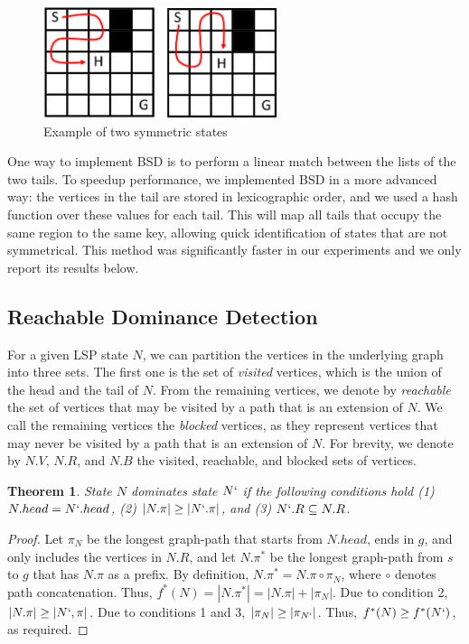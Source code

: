 \documentclass[letterpaper]{article} %
\newcommand\Yossi[1]{\nb{\textbf{Yossi:}}{green}{#1}}
\newcommand\Roni[1]{\nb{\textbf{Roni:}}{blue}{#1}}
\newtheorem{theorem}{Theorem}
\begin{document}
\begin{figure}[ht!]
  \centering
  \includegraphics[width=2.7in]{fig/bsd-example.png}
  \caption{Example of two symmetric states}\label{bsd-example}
\end{figure}

One way to implement BSD is to perform a linear match between the lists of the two tails. To speedup performance, we implemented BSD in a more advanced way: the vertices in the tail are stored in lexicographic order, and we used a hash function over these values for each tail. This will map all tails that occupy the same region to the same key, allowing quick identification of states that are not symmetrical. This method was significantly faster in our experiments and we only report its results below.

\subsection{Reachable Dominance Detection}
For a given LSP state $N$, we can partition the vertices in the underlying graph into three sets. The first one is the set of {\em visited} vertices, which is the union of the head and the tail of $N$. 
From the remaining vertices, we denote by \emph{reachable} the set of vertices that may be visited by a path that is an extension of $N$. 
We call the remaining vertices the \emph{blocked} vertices, as they represent vertices that may never be visited by a path that is an extension of $N$. 
For brevity, we denote by $N.V$, $N.R$, and $N.B$ the visited, reachable, and blocked sets of vertices. 

\begin{theorem}
State $N$ dominates state $N`$ if the following conditions hold (1)$N.head=N`.head$, 
(2) $|N.\pi| \geq |N`.\pi|$, and (3) $N`.R \subseteq N.R$.
 \label{the:rsd}
\end{theorem}
\begin{proof}

Let $\pi_N$ be the longest graph-path that starts from $N.head$, 
ends in $g$, and only includes the vertices in $N.R$, 
and let $N.\pi^*$ be the longest graph-path from $s$ to $g$ that has $N.\pi$ as a prefix. 
By definition, $N.\pi^*=N.\pi \circ \pi_N$, where $\circ$ denotes path concatenation. 
Thus, $f^*(N)=|N.\pi^*|=|N.\pi|+|\pi_N|$. 
Due to condition 2, $|N.\pi|\geq |N`,\pi|$. 
Due to conditions 1 and 3, $|\pi_N|\geq |\pi_{N`}|$. 
Thus, $f^*(N)\geq f^*(N`)$, as required. 
\end{proof}
\end{document}
